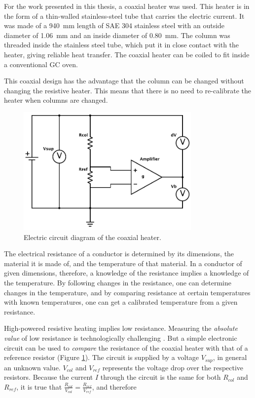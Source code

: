 For the work presented in this thesis, a coaxial heater was used. This heater is
in the form of a thin-walled stainless-steel tube that carries the electric
current. It was made of a \SI{940}{\milli\metre} length of SAE 304 stainless
steel with an outside diameter of \SI{1.06}{\milli\metre} and an inside diameter
of \SI{0.80}{\milli\metre}. The column was threaded inside the stainless steel
tube, which put it in close contact with the heater, giving reliable heat
transfer.
The coaxial heater can be coiled to fit inside a conventional GC oven.

This coaxial design has the advantage that the column can be changed without
changing the resistive heater. This means that there is no need to re-calibrate
the heater when columns are changed.

\begin{figure}[htbp]
	\centering
	\includegraphics[width=0.8\textwidth]{Figures/Column-Heater.pdf}
	\decoRule
	\caption[Coaxial heater resistance heater]{\label{fig:HeaterDiagram}Electric circuit diagram of the coaxial heater.}
\end{figure}

The electrical resistance of a conductor is determined by its dimensions, the
material it is made of, and the temperature of that material. In a conductor of
given dimensions, therefore, a knowledge of the resistance implies a knowledge
of the temperature. By following changes in the resistance, one can determine
changes in the temperature, and by comparing resistance at certain temperatures
with known temperatures, one can get a calibrated temperature from a given
resistance.

High-powered resistive heating implies low resistance. Measuring the
\textit{absolute value} of low resistance is technologically challenging
\autocite{Dyos2012}. But a simple electronic circuit can be used to
\textit{compare} the resistance of the coaxial heater with that of a reference
resistor (Figure \ref{fig:HeaterDiagram}). The circuit is supplied by a voltage
\(V_{sup}\), in general an unknown value.
\(V_{col}\) and \(V_{ref}\) represents the voltage drop over the respective
resistors. Because the current \(I\) through the circuit is the same for both
\(R_{col}\) and \(R_{ref}\), it is true that
\(\frac{R_{col}}{V_{col}} = \frac{ R_{ref} }{ V_{ref} }\), and therefore

